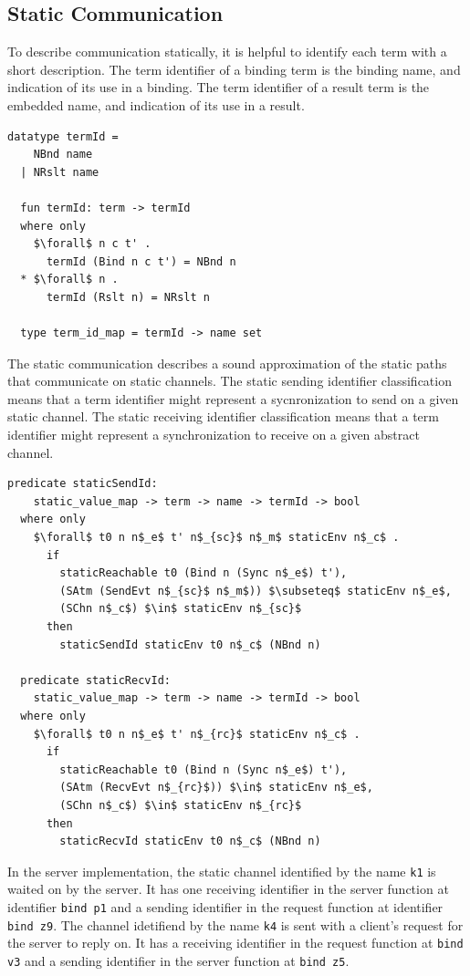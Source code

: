 \documentclass[letterpaper, 11pt]{extarticle}
\begin{document}
\subsection{Static Communication}
To describe communication statically, it is helpful to identify each term with a short description.
The term identifier of a binding term is the binding name, and indication of its use in a binding.
The term identifier of a result term is the embedded name, and indication of its use in a result.

\begin{lstlisting}[language=logic, mathescape]
  datatype termId =
    NBnd name
  | NRslt name 

  fun termId: term -> termId
  where only
    $\forall$ n c t' . 
      termId (Bind n c t') = NBnd n
  * $\forall$ n . 
      termId (Rslt n) = NRslt n

  type term_id_map = termId -> name set
\end{lstlisting}

The static communication describes a sound approximation of
the static paths that communicate on static channels.
The static sending identifier classification means that a term identifier might represent a
sycnronization to send on a given static channel.
The static receiving identifier classification means that a term identifier might represent a
synchronization to receive on a given abstract channel. 

\begin{lstlisting}[language=logic, mathescape]
  predicate staticSendId:
    static_value_map -> term -> name -> termId -> bool
  where only
    $\forall$ t0 n n$_e$ t' n$_{sc}$ n$_m$ staticEnv n$_c$ .
      if
        staticReachable t0 (Bind n (Sync n$_e$) t'),
        (SAtm (SendEvt n$_{sc}$ n$_m$)) $\subseteq$ staticEnv n$_e$, 
        (SChn n$_c$) $\in$ staticEnv n$_{sc}$
      then
        staticSendId staticEnv t0 n$_c$ (NBnd n)

  predicate staticRecvId:
    static_value_map -> term -> name -> termId -> bool
  where only
    $\forall$ t0 n n$_e$ t' n$_{rc}$ staticEnv n$_c$ .
      if
        staticReachable t0 (Bind n (Sync n$_e$) t'),
        (SAtm (RecvEvt n$_{rc}$)) $\in$ staticEnv n$_e$, 
        (SChn n$_c$) $\in$ staticEnv n$_{rc}$ 
      then
        staticRecvId staticEnv t0 n$_c$ (NBnd n)
\end{lstlisting}


In the server implementation,
the static channel identified by the name \lstinline{k1} is waited on
by the server.  It has one receiving identifier in the server function
at identifier \lstinline[language=sugar_lang]{bind p1} and a sending identifier 
in the request function at identifier \lstinline[language=sugar_lang]{bind z9}.
The channel idetifiend by the name \lstinline{k4} is sent with a client's request for
the server to reply on. It has a receiving identifier in the request function at
\lstinline[language=sugar_lang]{bind v3} and a sending identifier in the server function at
\lstinline[language=sugar_lang]{bind z5}.
\end{document}
